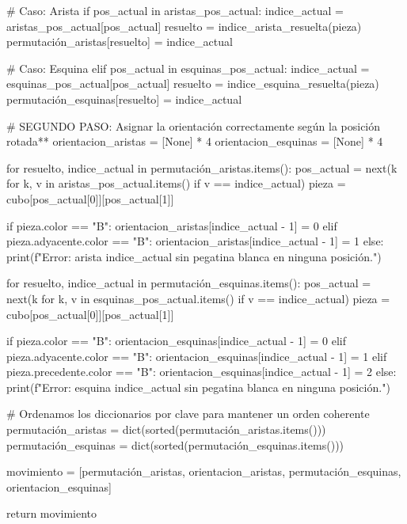                 # Caso: Arista
                if pos_actual in aristas_pos_actual:
                    indice_actual = aristas_pos_actual[pos_actual]
                    resuelto = indice_arista_resuelta(pieza)
                    permutación_aristas[resuelto] = indice_actual
                
                # Caso: Esquina
                elif pos_actual in esquinas_pos_actual:
                    indice_actual = esquinas_pos_actual[pos_actual]
                    resuelto = indice_esquina_resuelta(pieza)
                    permutación_esquinas[resuelto] = indice_actual
    
    # SEGUNDO PASO: Asignar la orientación correctamente según la posición rotada**
    orientacion_aristas = [None] * 4
    orientacion_esquinas = [None] * 4

    for resuelto, indice_actual in permutación_aristas.items():
        pos_actual = next(k for k, v in aristas_pos_actual.items() if v == indice_actual)
        pieza = cubo[pos_actual[0]][pos_actual[1]]
        
        if pieza.color == "B":
            orientacion_aristas[indice_actual - 1] = 0
        elif pieza.adyacente.color == "B":
            orientacion_aristas[indice_actual - 1] = 1
        else:
            print(f"Error: arista {indice_actual} sin pegatina blanca en ninguna posición.")

    for resuelto, indice_actual in permutación_esquinas.items():
        pos_actual = next(k for k, v in esquinas_pos_actual.items() if v == indice_actual)
        pieza = cubo[pos_actual[0]][pos_actual[1]]
        
        if pieza.color == "B":
            orientacion_esquinas[indice_actual - 1] = 0
        elif pieza.adyacente.color == "B":
            orientacion_esquinas[indice_actual - 1] = 1
        elif pieza.precedente.color == "B":
            orientacion_esquinas[indice_actual - 1] = 2
        else:
            print(f"Error: esquina {indice_actual} sin pegatina blanca en ninguna posición.")

    # Ordenamos los diccionarios por clave para mantener un orden coherente
    permutación_aristas = dict(sorted(permutación_aristas.items()))
    permutación_esquinas = dict(sorted(permutación_esquinas.items()))
    
    movimiento = [permutación_aristas, orientacion_aristas, permutación_esquinas, orientacion_esquinas]
    
    
    return movimiento

